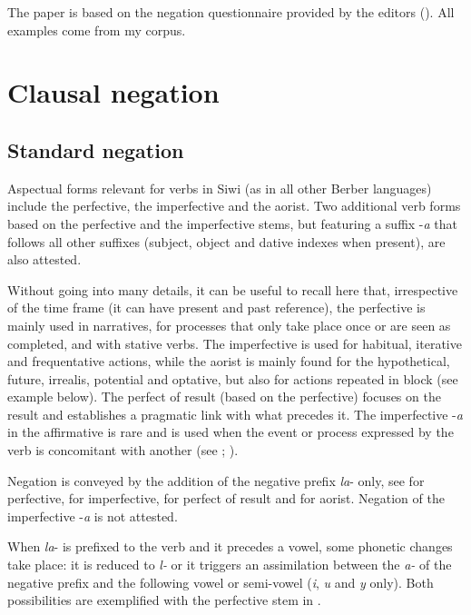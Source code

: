 \documentclass[output=paper,colorlinks,citecolor=brown]{langscibook}
\begin{document}
The paper is based on the negation questionnaire provided by the editors ().
All examples come from my corpus.

\section{Clausal negation}\label{sec:siw:2}

\subsection{Standard negation}\label{sec:siw:2.1}

Aspectual forms relevant for verbs in Siwi (as in all other Berber languages) include the perfective, the imperfective and the aorist. Two additional verb forms based on the perfective and the imperfective stems, but featuring a suffix -\textit{a} that follows all other suffixes (subject, object and dative indexes when present), are also attested. 

Without going into many details, it can be useful to recall here that, irrespective of the time frame (it can have present and past reference), the perfective is mainly used in narratives, for processes that only take place once or are seen as completed, and with stative verbs. The imperfective is used for habitual, iterative and frequentative actions, while the aorist is mainly found for the hypothetical, future, irrealis, potential and optative, but also for actions repeated in block (see example  below). The perfect of result (based on the perfective) focuses on the result and establishes a pragmatic link with what precedes it. The imperfective -\textit{a} in the affirmative is rare and is used when the event or process expressed by the verb is concomitant with another (see \citealt[197--199]{Souag2013}; \citealt{Schiattarella2019}).

Negation is conveyed by the addition of the negative prefix \textit{la}{}- only, see  for perfective,  for imperfective,  for perfect of result and  for aorist. Negation of the imperfective -\textit{a}  is not attested.

When \textit{la}{}- is prefixed to the verb and it precedes a vowel, some phonetic changes take place: it is reduced to \textit{l-} or it triggers an assimilation between the \textit{a{}-} of the negative prefix and the following vowel or semi-vowel (\textit{i}, \textit{u} and \textit{y} only). Both possibilities are exemplified with the perfective stem in .
\end{document}
